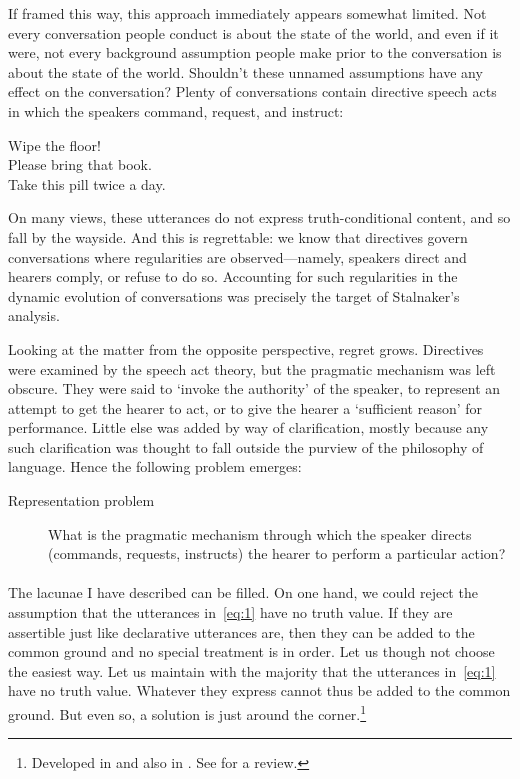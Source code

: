 If framed this way, this approach immediately appears somewhat limited. Not every conversation people conduct is about the state of the world, and even if it were, not every background assumption people make prior to the conversation is about the state of the world. Shouldn't these unnamed assumptions have any effect on the conversation? Plenty of conversations contain directive speech acts in which the speakers command, request, and instruct:
\begin{eqclaim}\label{eq:1}
  Wipe the floor!\\
  Please bring that book.\\
  Take this pill twice a day.
\end{eqclaim}
On many views, these utterances do not express truth-conditional content, and so fall by the wayside. And this is regrettable: we know that directives govern conversations where regularities are observed---namely, speakers direct and hearers comply, or refuse to do so. Accounting for such regularities in the dynamic evolution of conversations was precisely the target of Stalnaker's analysis.

Looking at the matter from the opposite perspective, regret grows. Directives were examined by the speech act theory, but the pragmatic mechanism was left obscure. They were said to `invoke the authority' of the speaker, to represent an attempt to get the hearer to act, or to give the hearer a `sufficient reason' for performance. Little else was added by way of clarification, mostly because any such clarification was thought to fall outside the purview of the philosophy of language. Hence the following problem emerges:
\begin{description}
\item[Representation problem] What is the pragmatic mechanism through which the speaker directs (commands, requests, instructs) the hearer to perform a particular action?
\end{description}

\paragraph{}
The lacunae I have described can be filled. On one hand, we could reject the assumption that the utterances in~\eqref{eq:1} have no truth value. If they are assertible just like declarative utterances are, then they can be added to the common ground and no special treatment is in order. Let us though not choose the easiest way. Let us maintain with the majority that the utterances in~\eqref{eq:1} have no truth value. Whatever they express cannot thus be added to the common ground. But even so, a solution is just around the corner.\footnote{Developed in \cite{Por04,Por07} and also in \cite{Han11}. See \cite{Por16} for a review.}

